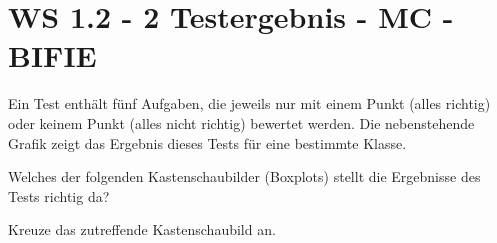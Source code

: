 \section{WS 1.2 - 2 Testergebnis - MC - BIFIE}

\begin{beispiel}[WS 1.2]{1} %

				\begin{minipage}[t]{0.6\textwidth}
				Ein Test enthält fünf Aufgaben, die jeweils nur mit einem Punkt (alles richtig) oder keinem Punkt (alles nicht richtig) bewertet werden. Die nebenstehende Grafik zeigt das Ergebnis dieses Tests für eine bestimmte Klasse.\leer
				
				Welches der folgenden Kastenschaubilder (Boxplots) stellt die Ergebnisse des Tests richtig da?\leer
				
				Kreuze das zutreffende Kastenschaubild an.
				\end{minipage}
				\begin{minipage}[t]{0.3\textwidth}
				\begin{center}~
				

\end{center}
\end{minipage}
\end{beispiel}
